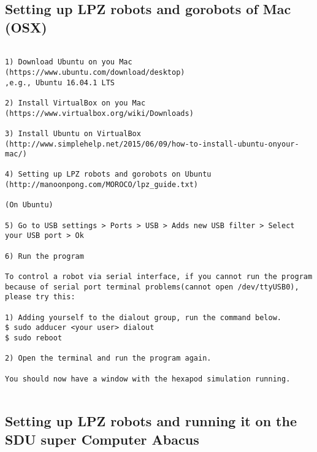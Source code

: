 \subsection{Setting up LPZ robots and gorobots of Mac (OSX)}

\begin{lstlisting}

1) Download Ubuntu on you Mac (https://www.ubuntu.com/download/desktop)
,e.g., Ubuntu 16.04.1 LTS

2) Install VirtualBox on you Mac (https://www.virtualbox.org/wiki/Downloads)

3) Install Ubuntu on VirtualBox 
(http://www.simplehelp.net/2015/06/09/how-to-install-ubuntu-onyour-mac/)

4) Setting up LPZ robots and gorobots on Ubuntu
(http://manoonpong.com/MOROCO/lpz_guide.txt)

(On Ubuntu)

5) Go to USB settings > Ports > USB > Adds new USB filter > Select your USB port > Ok

6) Run the program

To control a robot via serial interface, if you cannot run the program
because of serial port terminal problems(cannot open /dev/ttyUSB0), please try this:

1) Adding yourself to the dialout group, run the command below.
$ sudo adducer <your user> dialout
$ sudo reboot

2) Open the terminal and run the program again.

You should now have a window with the hexapod simulation running.


\end{lstlisting}


\subsection{Setting up LPZ robots and running it on the SDU super Computer Abacus}

